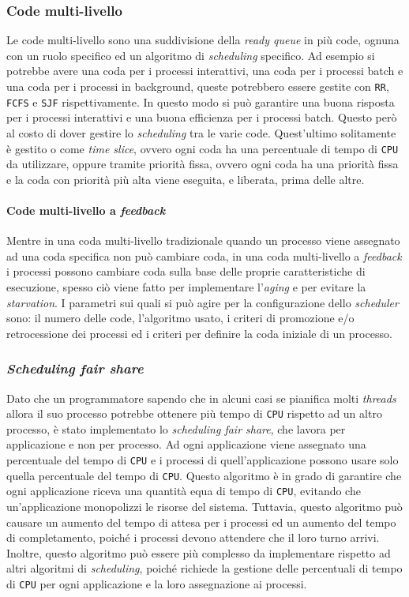             \subsubsection{Code multi-livello}
                Le code multi-livello sono una suddivisione della \textit{ready queue} in più code, ognuna con un ruolo specifico ed un algoritmo di \textit{scheduling} specifico. Ad esempio si potrebbe avere una coda per i processi interattivi, una coda per i processi batch e una coda per i processi in background, queste potrebbero essere gestite con \texttt{RR}, \texttt{FCFS} e \texttt{SJF} rispettivamente. In questo modo si può garantire una buona risposta per i processi interattivi e una buona efficienza per i processi batch. Questo però al costo di dover gestire lo \textit{scheduling} tra le varie code. Quest'ultimo solitamente è gestito o come \textit{time slice}, ovvero ogni coda ha una percentuale di tempo di \texttt{CPU} da utilizzare, oppure tramite priorità fissa, ovvero ogni coda ha una priorità fissa e la coda con priorità più alta viene eseguita, e liberata, prima delle altre. 
                \paragraph{Code multi-livello a \textit{feedback}} Mentre in una coda multi-livello tradizionale quando un processo viene assegnato ad una coda specifica non può cambiare coda, in una coda multi-livello a \textit{feedback} i processi possono cambiare coda sulla base delle proprie caratteristiche di esecuzione, spesso ciò viene fatto per implementare l'\textit{aging} e per evitare la \textit{starvation}. I parametri sui quali si può agire per la configurazione dello \textit{scheduler} sono: il numero delle code, l'algoritmo usato, i criteri di promozione e/o retrocessione dei processi ed i criteri per definire la coda iniziale di un processo.
            \subsubsection{\textit{Scheduling fair share}}
                Dato che un programmatore sapendo che in alcuni casi se pianifica molti \textit{threads} allora il suo processo potrebbe ottenere più tempo di \texttt{CPU} rispetto ad un altro processo, è stato implementato lo \textit{scheduling fair share}, che lavora per applicazione e non per processo. Ad ogni applicazione viene assegnato una percentuale del tempo di \texttt{CPU} e i processi di quell'applicazione possono usare solo quella percentuale del tempo di \texttt{CPU}. Questo algoritmo è in grado di garantire che ogni applicazione riceva una quantità equa di tempo di \texttt{CPU}, evitando che un'applicazione monopolizzi le risorse del sistema. Tuttavia, questo algoritmo può causare un aumento del tempo di attesa per i processi ed un aumento del tempo di completamento, poiché i processi devono attendere che il loro turno arrivi. Inoltre, questo algoritmo può essere più complesso da implementare rispetto ad altri algoritmi di \textit{scheduling}, poiché richiede la gestione delle percentuali di tempo di \texttt{CPU} per ogni applicazione e la loro assegnazione ai processi.
